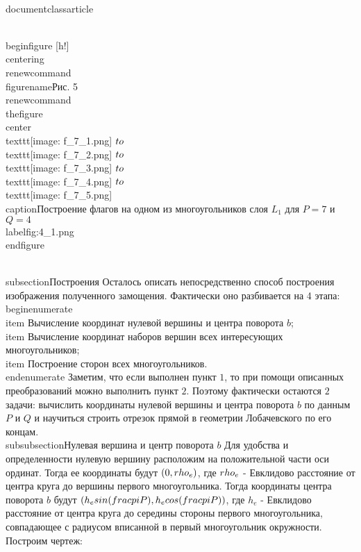 \\documentclass{article}
\begin{document}
\\begin{figure} [h!]
    \\centering
    \\renewcommand{\\figurename}{Рис. 5}
    \\renewcommand{\\thefigure}{}
    \\center{\\texttt{[image: f\_7\_1.png]} $\\to$ \\texttt{[image: f\_7\_2.png]} $\\to$ \\texttt{[image: f\_7\_3.png]} $\\to$ \\texttt{[image: f\_7\_4.png]} $\\to$ \\texttt{[image: f\_7\_5.png]}}
    \\caption{Построение флагов на одном из многоугольников слоя $L_{1}$ для $P = 7$ и $Q = 4$}
    \\label{fig:4_1.png}
\\end{figure}

\\subsection{Построения}
Осталось описать непосредственно способ построения изображения полученного замощения. Фактически оно разбивается на 4 этапа:
\\begin{enumerate}
    \\item Вычисление координат нулевой вершины и центра поворота $b$;
    \\item Вычисление координат наборов вершин всех интересующих многоугольников;
    \\item Построение сторон всех многоугольников.
\\end{enumerate}
Заметим, что если выполнен пункт $1$, то при помощи описанных преобразований можно выполнить пункт $2$. Поэтому фактически остаются $2$ задачи: вычислить координаты нулевой вершины и центра поворота $b$ по данным $P$ и $Q$ и научиться строить отрезок прямой в геометрии Лобачевского по его концам.
\\subsubsection{Нулевая вершина и центр поворота {$b$}}
Для удобства и определенности нулевую вершину расположим на положительной части оси ординат. Тогда ее координаты будут $(0, \\rho_e )$, где $\\rho_e$ - Евклидово расстояние от центра круга до вершины первого многоугольника. Тогда координаты центра поворота $b$ будут $(h_esin(\\frac{\\pi}{P}), h_ecos(\\frac{\\pi}{P}))$, где $h_e$ - Евклидово расстояние от центра круга до середины стороны первого многоугольника, совпадающее с радиусом вписанной в первый многоугольник окружности. Построим чертеж:
\end{document}
